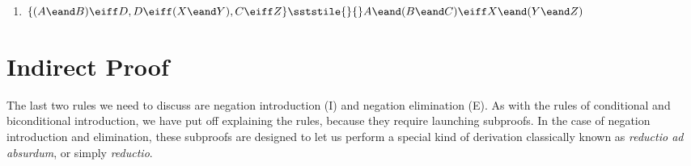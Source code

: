 \begin{enumerate}[label=(\arabic*)]
\item $\{(A \eand B) \eiff D, D \eiff (X \eand Y), C \eiff Z\} \sststile{}{} A \eand (B \eand C) \eiff X \eand (Y \eand Z)$
%
%
%	



\end{enumerate}	




\section{Indirect Proof}
\label{sec:indirect_proof}


The last two rules we need to discuss are negation introduction (\enot I)  and negation elimination (\enot E). As with the rules of conditional and biconditional introduction, we have put off explaining the rules, because they require launching subproofs. In the case of negation introduction and elimination, these subproofs are designed to let us perform a special kind of derivation classically known as \emph{reductio ad absurdum}, or simply \emph{reductio}. 

